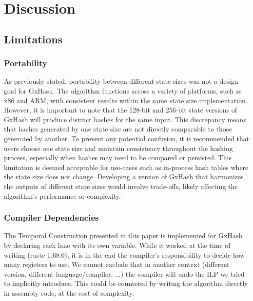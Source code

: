\documentclass[10pt]{article}
\begin{document}
\section{Discussion}
\subsection{Limitations}

\subsubsection{Portability}
As previously stated, portability between different state sizes was not a design goal for GxHash. The algorithm functions across a variety of platforms, such as x86 and ARM, with consistent results within the same state size implementation. However, it is important to note that the 128-bit and 256-bit state versions of GxHash will produce distinct hashes for the same input. This discrepancy means that hashes generated by one state size are not directly comparable to those generated by another. To prevent any potential confusion, it is recommended that users choose one state size and maintain consistency throughout the hashing process, especially when hashes may need to be compared or persisted. This limitation is deemed acceptable for use-cases such as in-process hash tables where the state size does not change. Developing a version of GxHash that harmonizes the outputs of different state sizes would involve trade-offs, likely affecting the algorithm’s performance or complexity.

\subsubsection{Compiler Dependencies} 
The Temporal Construction presented in this paper is implemented for GxHash by declaring each lane with its own variable. While it worked at the time of writing (rustc 1.68.0), it is in the end the compiler's responsibility to decide how many registers to use. We cannot exclude that in another context (different version, different language/compiler, ...) the compiler will undo the ILP we tried to implicitly introduce. This could be countered by writing the algorithm directly in assembly code, at the cost of complexity.
\end{document}
